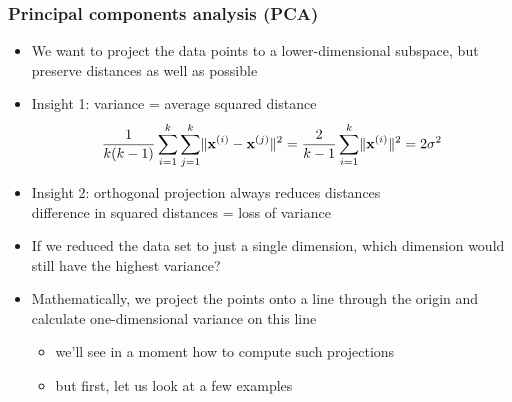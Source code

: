 \begin{frame}
  \frametitle{Principal components analysis (PCA)}

  \begin{itemize}
  \item We want to project the data points to a lower-dimensional subspace,
    but preserve distances as well as possible
  \item<2-> Insight 1: variance = average squared distance
    \[
    \frac{1}{k(k-1)} \sum_{i=1}^k \sum_{j=1}^k \norm{\vx[i] - \vx[j]}^2
    = \frac{2}{k-1} \sum_{i=1}^k \norm{\vx[i]}^2 = 2\sigma^2
    \]
  \item<3-> Insight 2: orthogonal projection always reduces distances\\
    \so difference in squared distances = loss of variance
  \item<4-> If we reduced the data set to just a single dimension,
    which dimension would still have the highest variance?
  \item<4-> Mathematically, we project the points onto a line through the origin
    and calculate one-dimensional variance on this line
    \begin{itemize}
    \item we'll see in a moment how to compute such projections
    \item but first, let us look at a few examples
    \end{itemize}
  \end{itemize}
\end{frame}

